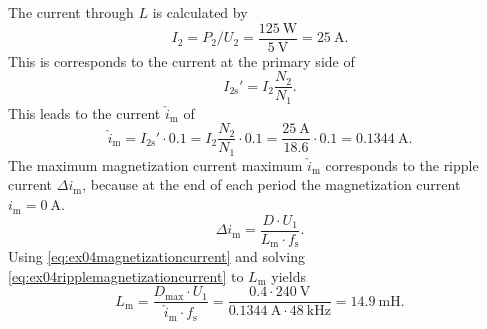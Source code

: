 \begin{solutionblock}
    The current through $L$ is calculated by
    \begin{equation}
        I_\mathrm{2}=P_\mathrm{2}/U_\mathrm{2}=\frac{\SI{125}{\watt}}{\SI{5}{\volt}}=\SI{25}{\ampere}
        \label{eq:ex04ouputcurrent}.
    \end{equation}
    This is corresponds to the current at the primary side of
    \begin{equation}
        I_\mathrm{2s}'=I_\mathrm{2}\frac{N_\mathrm{2}}{N_\mathrm{1}}.
    \end{equation}
    This leads to the current $\hat{i}_\mathrm{m}$ of
    \begin{equation}
        \hat{i}_\mathrm{m}=I_\mathrm{2s}'\cdot 0.1=I_\mathrm{2}\frac{N_\mathrm{2}}{N_\mathrm{1}}\cdot 0.1
        =\frac{\SI{25}{\ampere}}{18.6} \cdot 0.1 =\SI{0.1344}{\ampere}.
        \label{eq:ex04magnetizationcurrent}  
    \end{equation}
    The maximum magnetization current maximum $\hat{i}_\mathrm{m}$ corresponds to the ripple current $\Delta{i}_\mathrm{m}$,
    because at the end of each period the magnetization current $i_\mathrm{m}=\SI{0}{\ampere}$.
    \begin{equation}
        \Delta i_\mathrm{m}= \frac{D \cdot U_\mathrm{1}}{L_\mathrm{m} \cdot f_\mathrm{s}}.
        \label{eq:ex04ripplemagnetizationcurrent}
    \end{equation}
    Using \eqref{eq:ex04magnetizationcurrent} and solving \eqref{eq:ex04ripplemagnetizationcurrent} to $L_\mathrm{m}$ yields
    \begin{equation}
        L_\mathrm{m}= \frac{D_\mathrm{max} \cdot U_\mathrm{1}}{\hat{i}_\mathrm{m} \cdot f_\mathrm{s}}
                    = \frac{0.4 \cdot \SI{240}{\volt}}{\SI{0.1344}{\ampere} \cdot \SI{48}{\kilo\hertz}}=\SI{14.9}{\milli\henry}.
    \end{equation}
\end{solutionblock}

